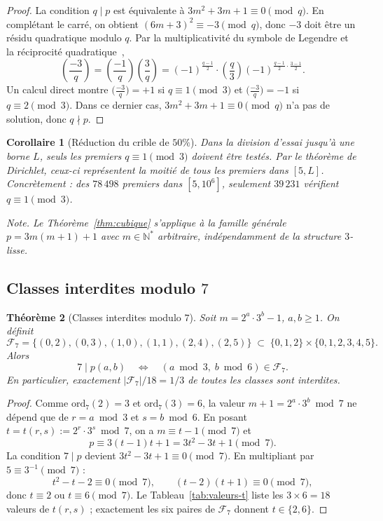 \documentclass[11pt,a4paper]{article}
\newtheorem{theoreme}{Théorème}[section]
\newtheorem{corollaire}[theoreme]{Corollaire}
\theoremstyle{definition}
\theoremstyle{remark}
\newcommand{\N}{\mathbb{N}}
\newcommand{\F}{\mathcal{F}}
\newcommand{\Leg}[2]{\left(\dfrac{#1}{#2}\right)}
\begin{document}
\begin{proof}
La condition $q\mid p$ est équivalente à $3m^2+3m+1\equiv 0\pmod{q}$.
En complétant le carré, on obtient $(6m+3)^2\equiv -3\pmod{q}$, donc
$-3$ doit être un résidu quadratique modulo $q$. Par la multiplicativité
du symbole de Legendre et la réciprocité quadratique~\cite{IrelandRosen},
\[
  \Leg{-3}{q} = \Leg{-1}{q}\Leg{3}{q}
  = (-1)^{\frac{q-1}{2}}\cdot\Leg{q}{3}(-1)^{\frac{q-1}{2}\cdot\frac{3-1}{2}}.
\]
Un calcul direct montre $\bigl(\tfrac{-3}{q}\bigr)=+1$ si $q\equiv 1\pmod{3}$
et $\bigl(\tfrac{-3}{q}\bigr)=-1$ si $q\equiv 2\pmod{3}$. Dans ce dernier
cas, $3m^2+3m+1\equiv 0\pmod{q}$ n'a pas de solution, donc $q\nmid p$.
\end{proof}

\begin{corollaire}[Réduction du crible de $50\%$]\label{cor:crible-50}
Dans la division d'essai jusqu'à une borne $L$, seuls les premiers
$q\equiv 1\pmod{3}$ doivent être testés. Par le théorème de Dirichlet,
ceux-ci représentent la moitié de tous les premiers dans $[5,L]$.
Concrètement : des $78\,498$ premiers dans $[5,10^6]$, seulement
$39\,231$ vérifient $q\equiv 1\pmod{3}$.

\smallskip
\noindent\emph{Note.} Le Théorème~\ref{thm:cubique} s'applique à la
famille générale $p=3m(m+1)+1$ avec $m\in\N^*$ arbitraire,
indépendamment de la structure $3$-lisse.
\end{corollaire}

\subsection{Classes interdites modulo $7$}

\begin{rigorousbox}
\begin{theoreme}[Classes interdites modulo $7$]\label{thm:mod7}
Soit $m = 2^a\cdot 3^b-1$, $a,b\geq 1$. On définit
\[
  \F_7 = \bigl\{(0,2),(0,3),(1,0),(1,1),(2,4),(2,5)\bigr\}
  \;\subset\; \{0,1,2\}\times\{0,1,2,3,4,5\}.
\]
Alors
\[
  7\mid p(a,b)\quad\Longleftrightarrow\quad
  (a\bmod 3,\;b\bmod 6)\in\F_7.
\]
En particulier, exactement $|\F_7|/18 = 1/3$ de toutes les classes
sont interdites.
\end{theoreme}
\end{rigorousbox}

\begin{proof}
Comme $\mathrm{ord}_7(2)=3$ et $\mathrm{ord}_7(3)=6$, la valeur
$m+1 = 2^a\cdot 3^b \bmod 7$ ne dépend que de $r=a\bmod 3$ et
$s=b\bmod 6$. En posant $t = t(r,s):= 2^r\cdot 3^s\bmod 7$,
on a $m\equiv t-1\pmod{7}$ et
\[
  p \equiv 3(t-1)t+1 = 3t^2-3t+1\pmod{7}.
\]
La condition $7\mid p$ devient $3t^2-3t+1\equiv 0\pmod{7}$.
En multipliant par $5\equiv 3^{-1}\pmod{7}$ :
\[
  t^2-t-2\equiv 0\pmod{7},\qquad(t-2)(t+1)\equiv 0\pmod{7},
\]
donc $t\equiv 2$ ou $t\equiv 6\pmod{7}$. Le Tableau~\ref{tab:valeurs-t}
liste les $3\times 6=18$ valeurs de $t(r,s)$ ; exactement les six paires
de $\F_7$ donnent $t\in\{2,6\}$.
\end{proof}
\end{document}
